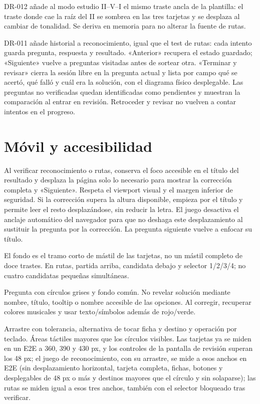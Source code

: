 \documentclass[a4paper,11pt]{article}
\let\originaltexttt\texttt
\renewcommand{\texttt}[1]{\originaltexttt{\seqsplit{#1}}}
\begin{document}
DR-012 añade al modo estudio II--V--I el mismo traste ancla de la
plantilla: el traste donde cae la raíz del II se sombrea en las tres
tarjetas y se desplaza al cambiar de tonalidad. Se deriva en memoria
para no alterar la fuente de rutas.

DR-011 añade historial a reconocimiento, igual que el test de rutas:
cada intento guarda pregunta, respuesta y resultado. «Anterior» recupera
el estado guardado; «Siguiente» vuelve a preguntas visitadas antes de
sortear otra. «Terminar y revisar» cierra la sesión libre en la pregunta
actual y lista por campo qué se acertó, qué falló y cuál era la
solución, con el diagrama físico desplegable. Las preguntas no
verificadas quedan identificadas como pendientes y muestran la
comparación al entrar en revisión. Retroceder y revisar no vuelven a
contar intentos en el progreso.

\Needspace{4cm}
\section{Móvil y accesibilidad}\label{muxf3vil-y-accesibilidad}

Al verificar reconocimiento o rutas, \texttt{useGameFocus} conserva el
foco accesible en el título del resultado y desplaza la página solo lo
necesario para mostrar la corrección completa y «Siguiente». Respeta el
viewport visual y el margen inferior de seguridad. Si la corrección
supera la altura disponible, empieza por el título y permite leer el
resto desplazándose, sin reducir la letra. El juego desactiva el anclaje
automático del navegador para que no deshaga este desplazamiento al
sustituir la pregunta por la corrección. La pregunta siguiente vuelve a
enfocar su título.

El fondo es el tramo corto de mástil de las tarjetas, no un mástil
completo de doce trastes. En rutas, partida arriba, candidata debajo y
selector 1/2/3/4; no cuatro candidatas pequeñas simultáneas.

Pregunta con círculos grises y fondo común. No revelar solución mediante
nombre, título, tooltip o nombre accesible de las opciones. Al corregir,
recuperar colores musicales y usar texto/símbolos además de rojo/verde.

Arrastre con tolerancia, alternativa de tocar ficha y destino y
operación por teclado. Áreas táctiles mayores que los círculos visibles.
Las tarjetas ya se miden en un E2E a 360, 390 y 430 px, y los controles
de la pantalla de revisión superan los 48 px; el juego de
reconocimiento, con su arrastre, se mide a esos anchos en E2E (sin
desplazamiento horizontal, tarjeta completa, fichas, botones y
desplegables de 48 px o más y destinos mayores que el círculo y sin
solaparse); las rutas se miden igual a esos tres anchos, también con el
selector bloqueado tras verificar.
\end{document}
